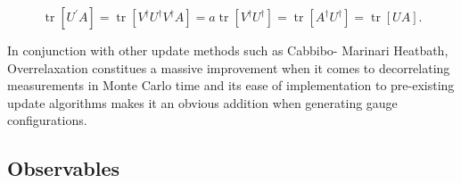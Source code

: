 \documentclass[a4paper,10pt]{article}
\begin{document}
\begin{equation}
\operatorname{tr}\left[U^{\prime} A\right]=\operatorname{tr}\left[V^{\dagger} U^{\dagger} V^{\dagger} A\right]=a \operatorname{tr}\left[V^{\dagger} U^{\dagger}\right]=\operatorname{tr}\left[A^{\dagger} U^{\dagger}\right]=\operatorname{tr}[U A].
\end{equation}

In conjunction with other update methods such as Cabbibo- Marinari Heatbath, Overrelaxation constitues a massive improvement when it comes to decorrelating measurements in Monte Carlo time \cite{PhysRevLett.58.2394} and its ease of implementation to pre-existing update algorithms makes it an obvious addition when generating gauge configurations.


\subsection{Observables}
\end{document}

